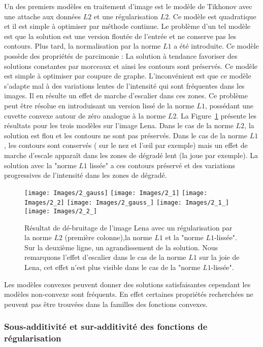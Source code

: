 \documentclass[../main/These_Mathias_Paget.tex]{subfiles}
\begin{document}
Un des premiers modèles en traitement d'image est le modèle de Tikhonov avec une attache aux données $L2$ et une régularisation $L2$. Ce modèle est quadratique et il est simple à optimiser par méthode continue. Le problème d'un tel modèle est que la solution est une version floutée de l'entrée et ne conserve pas les contours. Plus tard, la normalisation par la norme $L1$ a été introduite. Ce modèle possède des propriétés de parcimonie : La solution à tendance favoriser des solutions constantes par morceaux et ainsi les contours sont préservés. Ce modèle est simple à optimiser par coupure de graphe. L’inconvénient est que ce modèle s'adapte mal à des variations lentes de l'intensité qui sont fréquentes dans les images. Il en résulte un effet de marche d'escalier dans ces zones. Ce problème peut être résolue en introduisant un version lissé de la norme $L1$, possédant une cuvette convexe autour de zéro analogue à la norme $L2$. La Figure~\ref{fig:L1_L2} présente les résultats pour les trois modèles sur l'image Lena. Dans le cas de la norme $L2$, la solution est flou et les contours ne sont pas préservés. Dans le cas de la norme $L1$, les contours sont conservés ( sur le nez et l'œil par exemple) mais un effet de marche d'escale apparaît dans les zones de dégradé lent (la joue par exemple). La solution avec la "norme $L1$ lissée" a ces contours préservé et des variations progressives de l'intensité dans les zones de dégradé.

\begin{figure}
\centering
\texttt{[image: Images/2\_gauss]}
\texttt{[image: Images/2\_1]}
\texttt{[image: Images/2\_2]}
\hspace{10 pt}
\texttt{[image: Images/2\_gauss\_]}
\texttt{[image: Images/2\_1\_]}
\texttt{[image: Images/2\_2\_]}
\caption{Résultat de dé-bruitage de l'image Lena avec un régularisation par la norme $L2$ (première colonne),la norme $L1$ et la "norme $L1$-lissée". Sur la deuxième ligne, un agrandissement de la solution. Nous remarquons l'effet d'escalier dans le cas de la norme $L1$ sur la joie de Lena, cet effet n'est plus visible dans le cas de la "norme $L1$-lissée".}
\label{fig:L1_L2}
\end{figure}

Les modèles convexes peuvent donner des solutions satisfaisantes cependant les modèles non-convexe sont fréquents. En effet certaines propriétés recherchées ne peuvent pas être trouvées dans la familles des fonctions convexes.

\subsubsection{Sous-additivité et sur-additivité des fonctions de régularisation}
\label{sss:sub_add}
\end{document}
